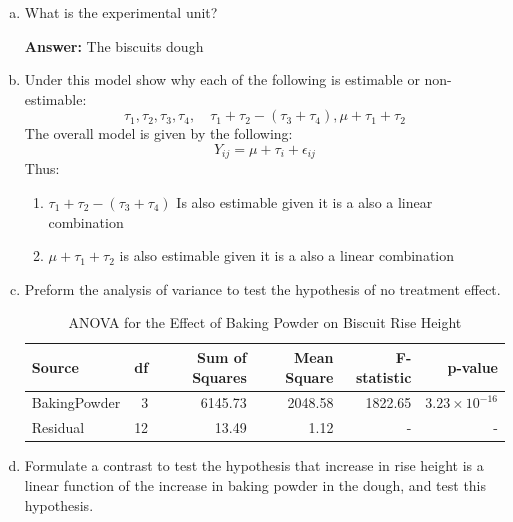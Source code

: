 \documentclass{article}
\begin{document}
\begin{enumerate}[(a)]
	\item What is the experimental unit?

	      \textbf{Answer:} The biscuits dough
	\item Under this model  show why each of the following is estimable or non-estimable:
	      $$
		      \tau_1, \tau_2, \tau_3,\tau_4, \quad \tau_1 + \tau_2 - (\tau_3 + \tau_4), \mu + \tau_1 + \tau_2
	      $$
	      The overall model is given by the following:
	      $$
		      Y_{ij} = \mu + \tau_i + \epsilon_{ij}
	      $$
	      Thus:
	      \begin{enumerate}
		      \item $\tau_1 + \tau_2 -(\tau_3 + \tau_4)$ Is also estimable given it is a also a linear combination
		      \item $\mu + \tau_1 + \tau_2$ is also estimable given it is a also a linear combination
	      \end{enumerate}
	\item Preform the analysis of variance to test the hypothesis of no treatment effect.
	      \begin{table}[!ht]
		      \centering
		      \caption{ANOVA for the Effect of Baking Powder on Biscuit Rise Height}
		      \begin{tabular}{lrrrrr}
			      \hline
			      \textbf{Source} & \textbf{df} & \textbf{Sum of Squares} & \textbf{Mean Square} & \textbf{F-statistic} & \textbf{p-value}         \\
			      \hline
			      BakingPowder    & 3           & 6145.73                 & 2048.58              & 1822.65              & \(3.23 \times 10^{-16}\) \\
			      Residual        & 12          & 13.49                   & 1.12                 & -                    & -                        \\
			      \hline
		      \end{tabular}
	      \end{table}

	\item Formulate a contrast to test the hypothesis that increase in rise height is a linear function of the increase in baking powder in the dough,
	      and test this hypothesis.


\end{enumerate}
\end{document}

